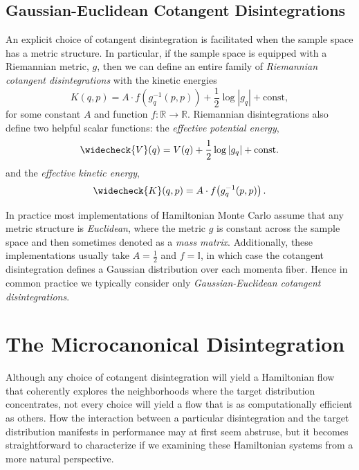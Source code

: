 \documentclass[stslayout]{imsart}
\begin{document}
\subsection{Gaussian-Euclidean Cotangent Disintegrations}

An explicit choice of cotangent disintegration is facilitated when the sample
space has a metric structure.  In particular, if the sample space is
equipped with a Riemannian metric, $g$, then we can define an entire 
family of \emph{Riemannian cotangent disintegrations} with the kinetic 
energies
%
\begin{equation*}
K \! \left( q, p \right) = A \cdot f \! \left( g^{-1}_{q} \! \left( p, p \right) \right)
+ \frac{1}{2} \log \left| g_{q} \right| + \mathrm{const},
\end{equation*}
%
for some constant $A$ and function $f: \mathbb{R} \rightarrow \mathbb{R}$.  
Riemannian disintegrations also define two helpful scalar functions: 
the \textit{effective potential energy},
%
\begin{equation*}
\widecheck{V} \! \left( q \right) 
= 
V \! \left( q \right) +  \frac{1}{2} \log \left| g_{q} \right| + \mathrm{const}.
\end{equation*}
%
and the \textit{effective kinetic energy},
%
\begin{equation*}
\widecheck{K} \! \left(q, p \right) 
= 
A \cdot f \! \left( g^{-1}_{q} \! \left( p, p \right) \right).
\end{equation*}

In practice most implementations of Hamiltonian Monte Carlo assume
that any metric structure is \emph{Euclidean}, where the metric $g$ is
constant across the sample space and then sometimes denoted as 
a \emph{mass matrix}.  Additionally, these implementations usually take
$A = \frac{1}{2}$ and $f = \mathbb{I}$, in which case the cotangent 
disintegration defines a Gaussian distribution over each momenta fiber.  
Hence in common practice we typically consider only 
\emph{Gaussian-Euclidean cotangent disintegrations}.

\section{The Microcanonical Disintegration}

Although any choice of cotangent disintegration will yield a Hamiltonian 
flow that coherently explores the neighborhoods where the target
distribution concentrates, not every choice will yield a flow that
is as computationally efficient as others.  How the interaction between
a particular disintegration and the target distribution manifests
in performance may at first seem abstruse, but it becomes 
straightforward to characterize if we examining these Hamiltonian 
systems from a more natural perspective.
\end{document}
